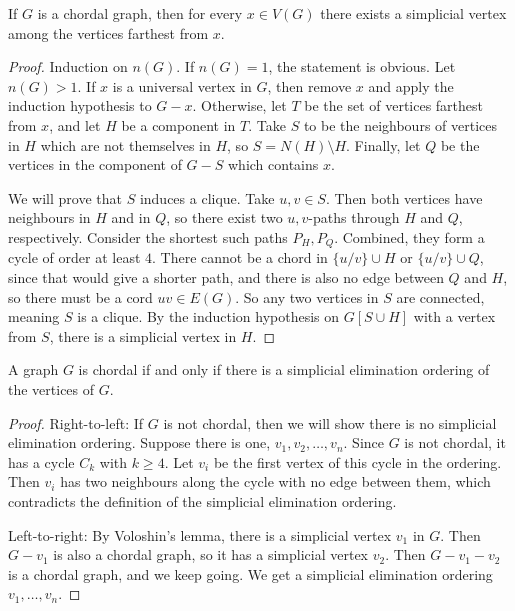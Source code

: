 \begin{lemma}[Voloshin]
  If $G$ is a chordal graph, then for every $x \in V(G)$ there exists a
  simplicial vertex among the vertices farthest from $x$.
\end{lemma}

\begin{proof}
  Induction on $n(G)$.
  If $n(G) = 1$, the statement is obvious.
  Let $n(G) > 1$.
  If $x$ is a universal vertex in $G$, then remove $x$ and apply the induction
  hypothesis to $G-x$.
  Otherwise, let $T$ be the set of vertices farthest from $x$, and let $H$ be a
  component in $T$.
  Take $S$ to be the neighbours of vertices in $H$ which are not themselves in
  $H$, so $S = N(H) \setminus H$.
  Finally, let $Q$ be the vertices in the component of $G-S$ which contains $x$.

  We will prove that $S$ induces a clique.
  Take $u, v \in S$.
  Then both vertices have neighbours in $H$ and in $Q$, so there exist two
  $u,v$-paths through $H$ and $Q$, respectively.
  Consider the shortest such paths $P_H, P_Q$.
  Combined, they form a cycle of order at least $4$.
  There cannot be a chord in $\{u/v\} \cup H$ or $\{u/v\} \cup Q$, since that
  would give a shorter path, and there is also no edge between $Q$ and $H$, so
  there must be a cord $uv \in E(G)$.
  So any two vertices in $S$ are connected, meaning $S$ is a clique.
  By the induction hypothesis on $G[S \cup H]$ with a vertex from $S$, there is
  a simplicial vertex in $H$.
\end{proof}


\begin{theorem}
  A graph $G$ is chordal if and only if there is a simplicial elimination
  ordering of the vertices of $G$.
\end{theorem}

\begin{proof}
  Right-to-left:
  If $G$ is not chordal, then we will show there is no simplicial elimination
  ordering.
  Suppose there is one, $v_1, v_2, \ldots, v_n$.
  Since $G$ is not chordal, it has a cycle $C_k$ with $k \ge 4$.
  Let $v_i$ be the first vertex of this cycle in the ordering.
  Then $v_i$ has two neighbours along the cycle with no edge between them, which
  contradicts the definition of the simplicial elimination ordering.

  Left-to-right:
  By Voloshin's lemma, there is a simplicial vertex $v_1$ in $G$.
  Then $G - v_1$ is also a chordal graph, so it has a simplicial vertex $v_2$.
  Then $G - v_1 - v_2$ is a chordal graph, and we keep going.
  We get a simplicial elimination ordering $v_1, \ldots, v_n$.
\end{proof}

